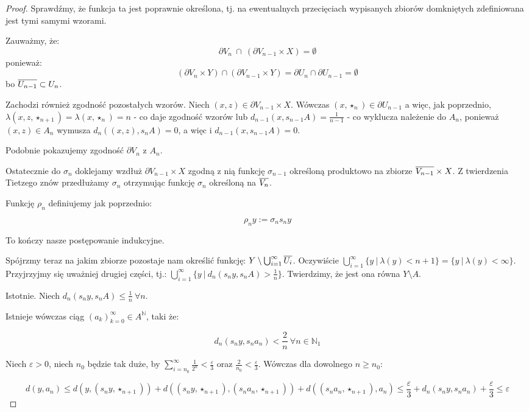 \begin{thm}
\begin{proof}
  Sprawdźmy, że funkcja ta jest poprawnie określona, tj. na ewentualnych przecięciach wypisanych zbiorów domkniętych zdefiniowana jest tymi samymi wzorami.
  
  Zauważmy, że:
  $$\partial V_n\ \cap\ (\partial V_{n-1} \times X) = \emptyset$$
  ponieważ:
  $$(\partial V_n \times Y) \cap (\partial V_{n-1} \times Y) = \partial U_n \cap \partial U_{n-1} = \emptyset$$
  bo $\overline{U_{n-1}} \subset U_n$.
  
  Zachodzi również zgodność pozostałych wzorów. Niech $(x, z) \in \partial V_{n-1} \times X$. Wówczas $(x, \star_n) \in \partial U_{n-1}$ a więc, jak poprzednio, $\lambda(x, z, \star_{n+1}) = \lambda(x, \star_n) = n$ - co daje zgodność wzorów lub $d_{n-1}(x, s_{n-1} A) = \frac{1}{n-1}$ - co wyklucza należenie do $A_n$, ponieważ $(x, z) \in A_n$ wymusza $d_{n}((x, z), s_{n} A) = 0$, a więc i $d_{n-1}(x, s_{n-1} A) = 0$.
  
  Podobnie pokazujemy zgodność $\partial V_n$ z $A_n$.
  
  Ostatecznie do $\sigma_n$ doklejamy wzdłuż $\partial V_{n-1} \times X$ zgodną z nią funkcję $\sigma_{n-1}$ określoną produktowo na zbiorze $\overline{V_{n-1}} \times X$. Z twierdzenia Tietzego znów przedłużamy $\sigma_n$ otrzymując funkcję $\sigma_n$ określoną na $\overline{V_n}$.
  
  Funkcję $\rho_n$ definiujemy jak poprzednio:
  
  $$\rho_n y := \sigma_n s_n y$$
  
  To kończy nasze postępowanie indukcyjne.

  Spójrzmy teraz na jakim zbiorze pozostaje nam określić funkcję: $Y \setminus \bigcup_{i=1}^\infty \overline{U_i}$. Oczywiście $\bigcup_{i=1}^\infty \{y\ |\ \lambda(y) < n+1\} = \{y\ |\ \lambda(y) < \infty\}$. Przyjrzyjmy się uważniej drugiej części, tj.: $\bigcup_{i=1}^\infty \{y\ |\ d_n(s_n y, s_n A) > \frac{1}{n}\}$. Twierdzimy, że jest ona równa $Y \setminus A$.
  
  Istotnie. Niech $d_n(s_n y, s_n A) \leq \frac{1}{n}\ \forall n$.
  
  Istnieje wówczas ciąg $(a_k)_{k=0}^\infty \in A^\mathbb{N}$, taki że:
  
  $$d_n(s_n y, s_n a_n) < \frac{2}{n}\ \forall n \in \mathbb{N}_1$$
  
  Niech $\varepsilon > 0$, niech $n_0$ będzie tak duże, by $\sum_{i=n_0}^\infty \frac{1}{2^n}< \frac{\varepsilon}{3}$ oraz $\frac{2}{n_0} < \frac{\varepsilon}{3}$. Wówczas dla dowolnego $n \geq n_0$:
  
  $$d(y, a_n) \leq d(y, (s_n y, \star_{n+1})) + d((s_n y, \star_{n+1}), (s_n a_n, \star_{n+1})) + d((s_n a_n, \star_{n+1}), a_n) \leq \frac{\varepsilon}{3} + d_n(s_n y, s_n a_n) + \frac{\varepsilon}{3} \leq \varepsilon$$
  

\end{proof}
\end{thm}
